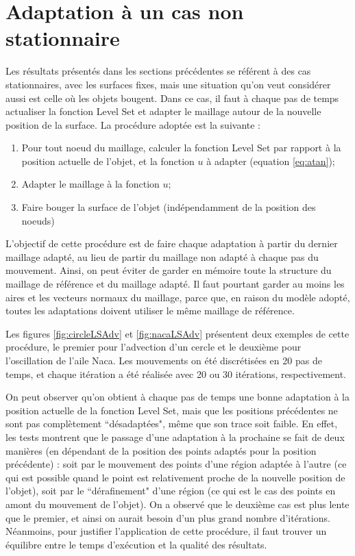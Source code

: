 
\section{Adaptation à un cas non stationnaire}
\label{sec:nonstat}

\indent Les résultats présentés dans les sections précédentes se référent à des cas stationnaires, avec les surfaces fixes, mais une situation qu'on veut considérer aussi  est celle où les objets bougent. Dans ce cas, il faut à chaque pas de temps actualiser la fonction Level Set et adapter le maillage autour de la nouvelle position de la surface. La procédure adoptée est la suivante : 

\begin{enumerate}
	\item Pour tout noeud du maillage, calculer la fonction Level Set par rapport à la position actuelle de l'objet, et la fonction \(u\) à adapter (equation \eqref{eq:atan});
	\item Adapter le maillage à la fonction \(u\);
	\item Faire bouger la surface de l'objet (indépendamment de la position des noeuds)
\end{enumerate}

\indent L'objectif de cette procédure est de faire chaque adaptation à partir du dernier maillage adapté, au lieu de partir du maillage non adapté à chaque pas du mouvement. Ainsi, on peut éviter de garder en mémoire toute la structure du maillage de référence et du maillage adapté. Il faut pourtant garder au moins les aires et les vecteurs normaux du maillage, parce que, en raison du modèle adopté, toutes les adaptations doivent utiliser le même maillage de référence.

\indent Les figures \ref{fig:circleLSAdv} et \ref{fig:nacaLSAdv} présentent deux exemples de cette procédure, le premier pour l'advection d'un cercle et le deuxième pour l'oscillation de l'aile Naca. Les mouvements on été discrétisées en 20 pas de temps, et chaque itération a été réalisée avec 20 ou 30 itérations, respectivement.

\indent On peut observer qu'on obtient à chaque pas de temps une bonne adaptation à la position actuelle de la fonction Level Set, mais que les positions précédentes ne sont pas complètement ``désadaptées", même que son trace soit faible. En effet, les tests montrent que le passage d'une adaptation à la prochaine se fait de deux manières (en dépendant de la position des points adaptés pour la position précédente) : soit par le mouvement des points d'une région adaptée à l'autre (ce qui est possible quand le point est relativement proche de la nouvelle position de l'objet), soit par le ``dérafinement" d'une région (ce qui est le cas des points en amont du mouvement de l'objet). On a observé que le deuxième cas est plus lente que le premier, et ainsi on aurait besoin d'un plus grand nombre d'itérations. Néanmoins, pour justifier l'application de cette procédure, il faut trouver un équilibre entre le temps d'exécution et la qualité des résultats.

